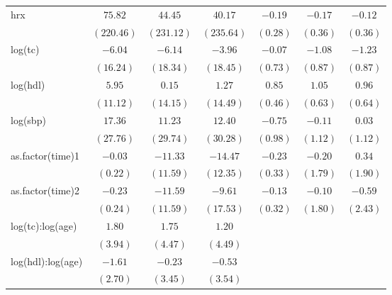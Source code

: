 \begin{tabular}{l c c c c c c}
hrx                               & $75.82$      & $44.45$    & $40.17$    & $-0.19$        & $-0.17$        & $-0.12$        \\
                                  & $(220.46)$   & $(231.12)$ & $(235.64)$ & $(0.28)$       & $(0.36)$       & $(0.36)$       \\
log(tc)                           & $-6.04$      & $-6.14$    & $-3.96$    & $-0.07$        & $-1.08$        & $-1.23$        \\
                                  & $(16.24)$    & $(18.34)$  & $(18.45)$  & $(0.73)$       & $(0.87)$       & $(0.87)$       \\
log(hdl)                          & $5.95$       & $0.15$     & $1.27$     & $0.85$         & $1.05$         & $0.96$         \\
                                  & $(11.12)$    & $(14.15)$  & $(14.49)$  & $(0.46)$       & $(0.63)$       & $(0.64)$       \\
log(sbp)                          & $17.36$      & $11.23$    & $12.40$    & $-0.75$        & $-0.11$        & $0.03$         \\
                                  & $(27.76)$    & $(29.74)$  & $(30.28)$  & $(0.98)$       & $(1.12)$       & $(1.12)$       \\
as.factor(time)1                  & $-0.03$      & $-11.33$   & $-14.47$   & $-0.23$        & $-0.20$        & $0.34$         \\
                                  & $(0.22)$     & $(11.59)$  & $(12.35)$  & $(0.33)$       & $(1.79)$       & $(1.90)$       \\
as.factor(time)2                  & $-0.23$      & $-11.59$   & $-9.61$    & $-0.13$        & $-0.10$        & $-0.59$        \\
                                  & $(0.24)$     & $(11.59)$  & $(17.53)$  & $(0.32)$       & $(1.80)$       & $(2.43)$       \\
log(tc):log(age)                  & $1.80$       & $1.75$     & $1.20$     &                &                &                \\
                                  & $(3.94)$     & $(4.47)$   & $(4.49)$   &                &                &                \\
log(hdl):log(age)                 & $-1.61$      & $-0.23$    & $-0.53$    &                &                &                \\
                                  & $(2.70)$     & $(3.45)$   & $(3.54)$   &                &                &                \\

\end{tabular}
